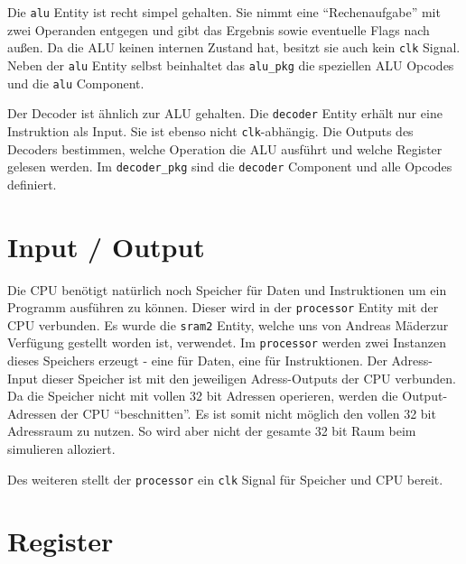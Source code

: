 \documentclass[paper=a4,fontsize=12pt,twocolumn]{scrreprt}
\begin{document}
Die \texttt{alu} Entity ist recht simpel gehalten.
Sie nimmt eine \enquote{Rechenaufgabe} mit zwei Operanden entgegen und gibt das Ergebnis sowie eventuelle Flags nach außen.
Da die ALU keinen internen Zustand hat, besitzt sie auch kein \texttt{clk} Signal.
Neben der \texttt{alu} Entity selbst beinhaltet das \texttt{alu\_pkg} die speziellen ALU Opcodes und die \texttt{alu} Component.

Der Decoder ist ähnlich zur ALU gehalten.
Die \texttt{decoder} Entity erhält nur eine Instruktion als Input.
Sie ist ebenso nicht \texttt{clk}-abhängig.
Die Outputs des Decoders bestimmen, welche Operation die ALU ausführt und welche Register gelesen werden.
Im \texttt{decoder\_pkg} sind die \texttt{decoder} Component und alle Opcodes definiert.


\section{Input / Output}

Die CPU benötigt natürlich noch Speicher für Daten und Instruktionen um ein Programm ausführen zu können.
Dieser wird in der \texttt{processor} Entity mit der CPU verbunden.
Es wurde die \texttt{sram2} Entity, welche uns von Andreas Mäder\footnotemark zur Verfügung gestellt worden ist, verwendet.
Im \texttt{processor} werden zwei Instanzen dieses Speichers erzeugt - eine für Daten, eine für Instruktionen.
Der Adress-Input dieser Speicher ist mit den jeweiligen Adress-Outputs der CPU verbunden.
Da die Speicher nicht mit vollen 32 bit Adressen operieren, werden die Output-Adressen der CPU \enquote{beschnitten}.
Es ist somit nicht möglich den vollen 32 bit Adressraum zu nutzen.
So wird aber nicht der gesamte 32 bit Raum beim simulieren alloziert.

Des weiteren stellt der \texttt{processor} ein \texttt{clk} Signal für Speicher und CPU bereit.

\section{Register}



\end{document}
